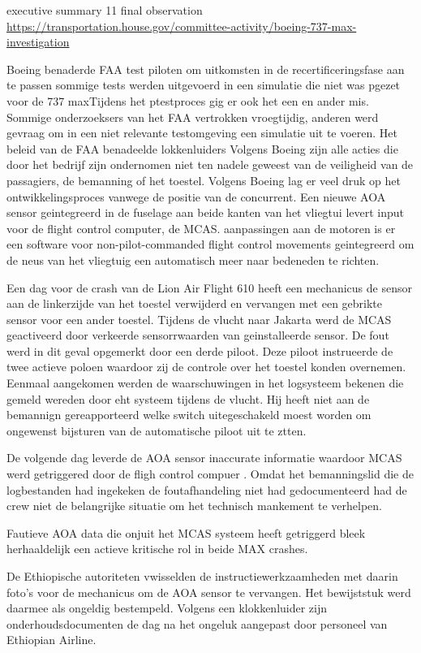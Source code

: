 \documentclass{article}
\begin{document}
executive summary
11 final observation
~\cite{737maxinvest}
\url{https://transportation.house.gov/committee-activity/boeing-737-max-investigation}


Boeing benaderde FAA test piloten om uitkomsten in de recertificeringsfase aan te passen
sommige tests werden uitgevoerd in een simulatie die niet was pgezet voor de 737 maxTijdens het ptestproces gig er ook het een en ander mis.
Sommige onderzoeksers van het FAA vertrokken vroegtijdig, anderen werd gevraag om in een niet relevante testomgeving een simulatie uit te voeren.
Het beleid van de FAA benadeelde lokkenluiders
Volgens Boeing zijn alle acties die door het bedrijf zijn ondernomen niet ten nadele geweest van de veiligheid van de passagiers, de bemanning of het toestel.
Volgens Boeing lag er veel druk op het ontwikkelingsproces vanwege de positie van de concurrent.
Een nieuwe AOA sensor geintegreerd in de fuselage aan beide kanten van het vliegtui levert input voor de flight control computer, de MCAS. aanpassingen aan de motoren is er een software voor non-pilot-commanded flight control movements geintegreerd om de neus van het vliegtuig een automatisch meer naar bedeneden te richten.

Een dag voor de crash van de Lion Air Flight 610 heeft een mechanicus de sensor aan de linkerzijde van het toestel verwijderd en vervangen met een gebrikte sensor voor een ander toestel. Tijdens de vlucht naar Jakarta werd de MCAS geactiveerd door verkeerde  sensorrwaarden van geinstalleerde sensor. De fout werd in dit geval opgemerkt door een derde piloot. Deze piloot instrueerde de twee actieve poloen waardoor zij de controle over het toestel konden overnemen. Eenmaal aangekomen werden de waarschuwingen in het logsysteem bekenen die gemeld wereden door eht systeem tijdens de vlucht. Hij heeft niet aan de bemannign gereapporteerd welke switch uitegeschakeld moest worden om ongewenst bijsturen van de automatische piloot uit te ztten.

De volgende dag leverde de AOA sensor inaccurate informatie waardoor MCAS werd getriggered door de fligh control compuer . Omdat  het bemanningslid die de logbestanden had ingekeken de foutafhandeling niet had gedocumenteerd had de crew niet de belangrijke situatie om het technisch mankement te verhelpen.

Fautieve AOA data die onjuit het MCAS systeem heeft getriggerd bleek herhaaldelijk een actieve kritische rol in beide MAX crashes.

De Ethiopische autoriteten vwisselden de instructiewerkzaamheden  met daarin foto's voor de mechanicus om de AOA sensor te vervangen. Het bewijststuk werd daarmee als ongeldig bestempeld.
Volgens een klokkenluider zijn onderhoudsdocumenten de dag na het ongeluk aangepast door personeel van Ethiopian Airline.
\end{document}
